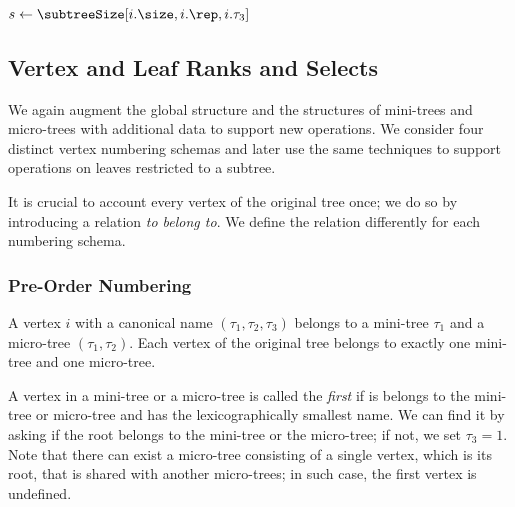 \begin{algorithm}
\begin{algorithmic}
		\State $s \gets \subtreeSize[i.\size, i.\rep, i.\tau_3]$
			\State {}
		\Else
			\State {}
		\EndIf
			\State {}
		\Else
			\State {}
		\EndIf
	\Else
		\State {}
	\EndIf
\EndFunction
\end{algorithmic}
\end{algorithm}

\subsection{Vertex and Leaf Ranks and Selects}

We again augment the global structure and the structures of mini-trees and micro-trees with additional data to support new operations.
We consider four distinct vertex numbering schemas and later use the same techniques to support operations on leaves restricted to a subtree.

It is crucial to account every vertex of the original tree once; we do so by introducing a relation \emph{to belong to}.
We define the relation differently for each numbering schema.

\subsubsection{Pre-Order Numbering}

A vertex $i$ with a canonical name $(\tau_1, \tau_2, \tau_3)$ belongs to a mini-tree $\tau_1$ and a micro-tree $(\tau_1, \tau_2)$.
Each vertex of the original tree belongs to exactly one mini-tree and one micro-tree.

A vertex in a mini-tree or a micro-tree is called the \emph{first} if is belongs to the mini-tree or micro-tree and has the lexicographically smallest name.
We can find it by asking if the root belongs to the mini-tree or the micro-tree; if not, we set $\tau_3 = 1$.
Note that there can exist a micro-tree consisting of a single vertex, which is its root, that is shared with another micro-trees; in such case, the first vertex is undefined.

\bigbreak

